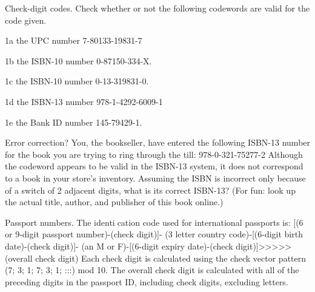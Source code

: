 \begin{question}{1}
Check-digit codes. Check whether or not the following codewords are valid for the
code given.
\end{question}

\begin{question}{1a}
the UPC number 7-80133-19831-7
\end{question}

\begin{question}{1b}
the ISBN-10 number 0-87150-334-X.
\end{question}

\begin{question}{1c}
the ISBN-10 number 0-13-319831-0.
\end{question}

\begin{question}{1d}
the ISBN-13 number 978-1-4292-6009-1
\end{question}

\begin{question}{1e}
the Bank ID number 145-79429-1.
\end{question}


\begin{question}{2}
Error correction? You, the bookseller, have entered the following ISBN-13 number for
the book you are trying to ring through the till:
978-0-321-75277-2
Although the codeword appears to be valid in the ISBN-13 system, it does not correspond
to a book in your store's inventory. Assuming the ISBN is incorrect only because of a switch
of 2 adjacent digits, what is its correct ISBN-13?
(For fun: look up the actual title, author, and publisher of this book online.)
\end{question}


\begin{question}{3}
Passport numbers. The identication code used for international passports is:
[(6 or 9-digit passport number)-(check digit)]-
(3 letter country code)-[(6-digit birth date)-(check digit)]-
(an M or F)-[(6-digit expiry date)-(check digit)]>>>>>(overall check digit)
Each check digit is calculated using the check vector pattern (7; 3; 1; 7; 3; 1; :::) mod 10.
The overall check digit is calculated with all of the preceding digits in the passport ID,
including check digits, excluding letters.
\end{question}

